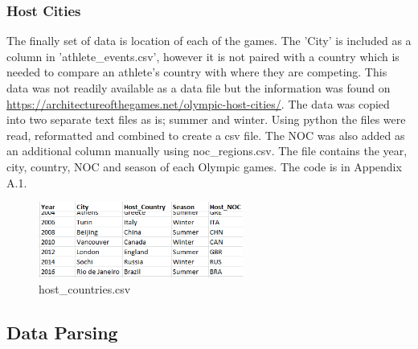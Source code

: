 \documentclass[a4 paper, 12pt]{article}
\begin{document}
    \subsubsection{Host Cities}
    The finally set of data is location of each of the games. The 'City' is included as a column in 'athlete\_events.csv', however it is not paired with a country which is needed to compare an athlete's country with where they are competing. This data was not readily available as a data file but the information was found on \url{https://architectureofthegames.net/olympic-host-cities/}. The data was copied into two separate text files as is; summer and winter. Using python the files were read, reformatted and combined to create a csv file. The NOC was also added as an additional column manually using noc\_regions.csv. The file contains the year, city, country, NOC and season of each Olympic games. The code is in Appendix A.1.
        \begin{figure} [H]
            \centering
            \includegraphics[width=0.6\textwidth, frame]
            {./images/data/host_countries.png}  
            \caption{host\_countries.csv}                  
        \end{figure}  

\subsection{Data Parsing}
\end{document}
